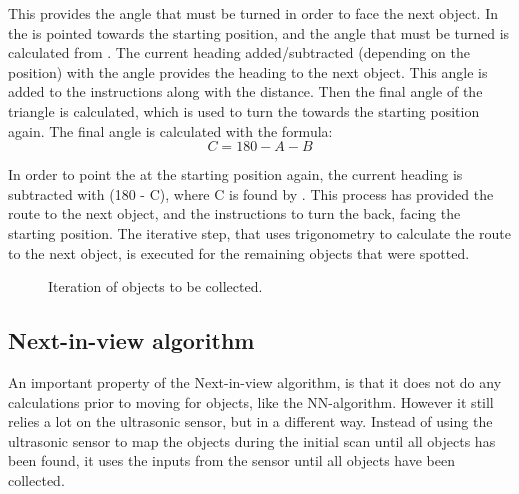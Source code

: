This provides the angle that must be turned in order to face the next object. In  the \projname{} is pointed towards the starting position, and the angle that must be turned is calculated from . The current heading added/subtracted (depending on the position) with the angle provides the heading to the next object. This angle is added to the instructions along with the distance. Then the final angle of the triangle is calculated, which is used to turn the \projname{} towards the starting position again. The final angle is calculated with the formula:
\begin{equation}
C = 180 - A - B \label{equation:C}
\end{equation}

In order to point the \projname{} at the starting position again, the current heading is subtracted with (180 - C), where C is found by . This process has provided the route to the next object, and the instructions to turn the \projname{} back, facing the starting position. The iterative step, that uses trigonometry to calculate the route to the next object, is executed for the remaining objects that were spotted.

\begin{figure}[H]
     \caption{\label{fig:object_navigation_iteration} Iteration of objects to be collected.}
\end{figure}


\subsection{Next-in-view algorithm} \label{sec:niv-algorithm}
An important property of the Next-in-view algorithm, is that it does not do any calculations prior to moving for objects, like the NN-algorithm. However it still relies a lot on the ultrasonic sensor, but in a different way. Instead of using the ultrasonic sensor to map the objects during the initial scan until all objects has been found, it uses the inputs from the sensor until all objects have been collected.

